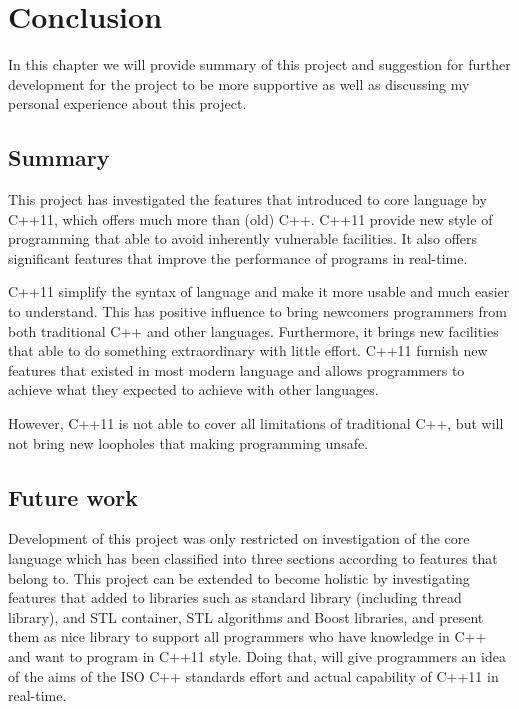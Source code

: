 \documentclass[11pt]{report}
\begin{document}
\chapter{Conclusion}
\label{chapter: conclusion}
In this chapter we will provide summary of this project and suggestion for further development for the project to be more supportive as well as discussing my personal experience about this project.
\section{Summary}
\label{se : summary}
This project has investigated the features that introduced to core language by C++11, which offers much more than (old) C++. C++11 provide new style of programming that able to avoid inherently vulnerable facilities. It also offers significant features that improve the performance of programs in real-time.

C++11 simplify the syntax of language and make it more usable and much easier to understand. This has positive influence to bring newcomers programmers from both traditional C++ and other languages. Furthermore, it brings new facilities that able to do something extraordinary with little effort.  C++11 furnish new features that existed in most modern language and allows programmers to achieve what they expected to achieve with other languages.

However, C++11 is not able to cover all limitations of traditional C++, but will not bring new loopholes that making programming unsafe.

\section{Future work}
\label{sec: future work}
Development of this project was only restricted on investigation of the core language which has been classified into three sections according to features that belong to. This project can be extended to become holistic by investigating features that added to libraries such as standard library (including thread library), and STL container, STL algorithms and Boost libraries, and present them as nice library to support all programmers who have knowledge in C++ and want to program in C++11 style. Doing that, will give programmers an idea of the aims of the ISO C++ standards effort and actual capability of C++11 in real-time.
\end{document}
